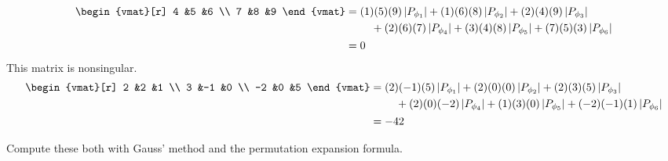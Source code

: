 \begin{exercises}
\begin{answer}
\begin{exparts}
\begin{align*}
\begin{vmat}[r]
              4  &5  &6  \\
              7  &8  &9
            \end{vmat}
            &=
            \begin{aligned}[t]
              &(1)(5)(9)\deter{P_{\phi_1}}
              +(1)(6)(8)\deter{P_{\phi_2}}
              +(2)(4)(9)\deter{P_{\phi_3}}  \\
              &\hbox{}\quad\hbox{}
              +(2)(6)(7)\deter{P_{\phi_4}}
              +(3)(4)(8)\deter{P_{\phi_5}}
              +(7)(5)(3)\deter{P_{\phi_6}}
            \end{aligned}                        \\
            &=0
          \end{align*}
        \partsitem This matrix is nonsingular. 
          \begin{align*}
            \begin{vmat}[r]
              2  &2  &1  \\
              3  &-1 &0  \\
              -2 &0  &5
            \end{vmat}
            &=
            \begin{aligned}[t]
              &(2)(-1)(5)\deter{P_{\phi_1}}
              +(2)(0)(0)\deter{P_{\phi_2}}
              +(2)(3)(5)\deter{P_{\phi_3}} \\
              &\hbox{}\quad\hbox{} 
              +(2)(0)(-2)\deter{P_{\phi_4}}
              +(1)(3)(0)\deter{P_{\phi_5}}
              +(-2)(-1)(1)\deter{P_{\phi_6}}
            \end{aligned}                      \\
            &=-42
        \end{align*}
      \end{exparts}
    \end{answer}
  \recommended \item
    Compute these both with Gauss' method and the permutation
    expansion formula.
\end{exercises}
